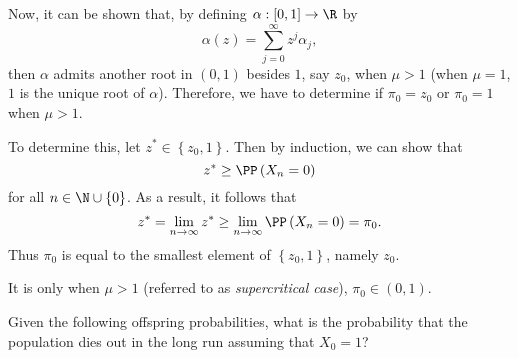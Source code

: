 \documentclass[stat333]{subfiles}
\begin{document}
\begin{itemize}
            Now, it can be shown that, by defining $\alpha:\left[ 0,1 \right]\to\R$ by
            \begin{equation*}
                \alpha\left( z \right) = \sum^{\infty}_{j=0}z^j\alpha_j,
            \end{equation*}
            then $\alpha$ admits another root in $\left( 0,1 \right)$ besides $1$, say $z_0$, when $\mu>1$ (when $\mu=1$, $1$ is the unique root of $\alpha$). Therefore, we have to determine if $\pi_0=z_0$ or $\pi_0=1$ when $\mu>1$.

            To determine this, let $z^{*}\in\left\lbrace z_0,1 \right\rbrace$. Then by induction, we can show that
            \begin{equation*}
                z^{*}\geq\PP\left( X_n=0 \right)
            \end{equation*}
            for all $n\in\N\cup\left\lbrace 0 \right\rbrace$. As a result, it follows that
            \begin{equation*}
                z^{*} = \lim_{n\to\infty}z^{*}\geq \lim_{n\to\infty}\PP\left( X_n=0 \right) = \pi_0.
            \end{equation*}
            Thus $\pi_0$ is equal to the smallest element of $\left\lbrace z_0,1 \right\rbrace$, namely $z_0$.

            It is only when $\mu>1$ (referred to as \textit{supercritical case}), $\pi_0\in\left( 0,1 \right)$.
    \end{itemize} 

    \ex Given the following offspring probabilities, what is the probability that the population dies out in the long run assuming that $X_0=1$?
\end{document}

